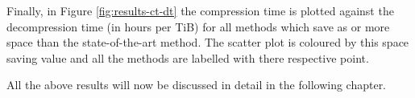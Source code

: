 Finally, in Figure \ref{fig:results-ct-dt} the compression time is plotted
against the decompression time (in hours per TiB) for all methods which save as
or more space than the state-of-the-art method. The scatter plot is coloured by
this space saving value and all the methods are labelled with there respective
point.

All the above results will now be discussed in detail in the following chapter.



%












%
